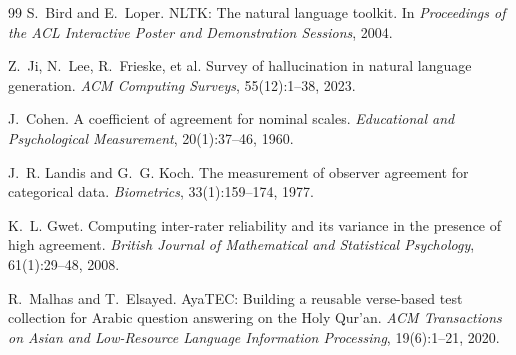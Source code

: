 \documentclass[11pt,a4paper]{article}
\begin{document}
\begin{thebibliography}{99}
S.~Bird and E.~Loper.
\newblock NLTK: The natural language toolkit.
\newblock In \emph{Proceedings of the ACL Interactive Poster and
Demonstration Sessions}, 2004.

Z.~Ji, N.~Lee, R.~Frieske, et al.
\newblock Survey of hallucination in natural language generation.
\newblock \emph{ACM Computing Surveys}, 55(12):1--38, 2023.

J.~Cohen.
\newblock A coefficient of agreement for nominal scales.
\newblock \emph{Educational and Psychological Measurement}, 20(1):37--46, 1960.

J.~R. Landis and G.~G. Koch.
\newblock The measurement of observer agreement for categorical data.
\newblock \emph{Biometrics}, 33(1):159--174, 1977.

K.~L. Gwet.
\newblock Computing inter-rater reliability and its variance in the presence
of high agreement.
\newblock \emph{British Journal of Mathematical and Statistical Psychology},
61(1):29--48, 2008.

R.~Malhas and T.~Elsayed.
\newblock AyaTEC: Building a reusable verse-based test collection for Arabic
question answering on the Holy Qur'an.
\newblock \emph{ACM Transactions on Asian and Low-Resource Language
Information Processing}, 19(6):1--21, 2020.

\end{thebibliography}
\end{document}
